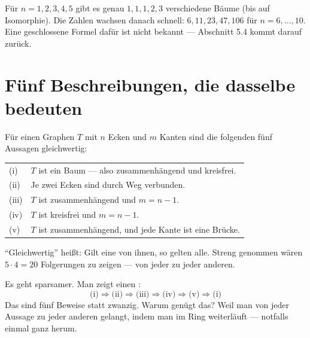 \begin{merksatz}
Für $n = 1,2,3,4,5$ gibt es genau $1, 1, 1, 2, 3$ verschiedene Bäume (bis auf Isomorphie). Die Zahlen wachsen danach schnell: $6, 11, 23, 47, 106$ für $n = 6, \ldots, 10$. Eine geschlossene Formel dafür ist nicht bekannt --- Abschnitt 5.4 kommt darauf zurück.
\end{merksatz}

\section{Fünf Beschreibungen, die dasselbe bedeuten}

\begin{merksatz}
Für einen Graphen $T$ mit $n$ Ecken und $m$ Kanten sind die folgenden fünf Aussagen gleichwertig:
\begin{center}
\renewcommand{\arraystretch}{1.55}
\begin{tabular}{@{}P{1.0cm}P{7.4cm}@{}}
\toprule
(i) & $T$ ist ein Baum --- also zusammenhängend und kreisfrei.\\
(ii) & Je zwei Ecken sind durch  Weg verbunden.\\
(iii) & $T$ ist zusammenhängend und $m = n-1$.\\
(iv) & $T$ ist kreisfrei und $m = n-1$.\\
(v) & $T$ ist zusammenhängend, und jede Kante ist eine Brücke.\\
\bottomrule
\end{tabular}
\end{center}
\end{merksatz}

\begin{merksatz}
\enquote{Gleichwertig} heißt: Gilt eine von ihnen, so gelten alle. Streng genommen wären $5 \cdot 4 = 20$ Folgerungen zu zeigen --- von jeder zu jeder anderen.

Es geht sparsamer. Man zeigt einen :
\[ \text{(i)} \Rightarrow \text{(ii)} \Rightarrow \text{(iii)} \Rightarrow \text{(iv)} \Rightarrow \text{(v)} \Rightarrow \text{(i)} \]
Das sind fünf Beweise statt zwanzig. Warum genügt das? Weil man von jeder Aussage zu jeder anderen gelangt, indem man im Ring weiterläuft --- notfalls einmal ganz herum.

\begin{center}
\end{center}
\end{merksatz}


